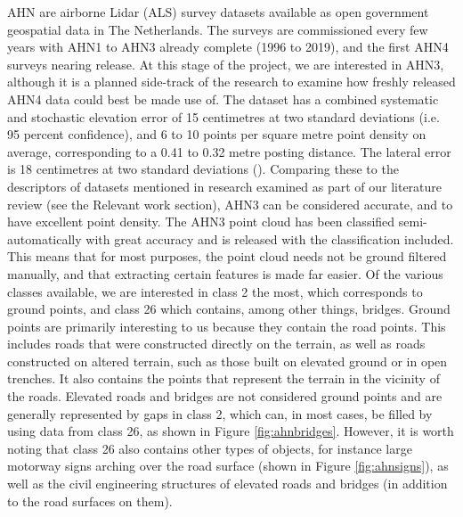 AHN are airborne Lidar (ALS) survey datasets available as open government geospatial data in The Netherlands. The surveys are commissioned every few years with AHN1 to AHN3 already complete (1996 to 2019), and the first AHN4 surveys nearing release. At this stage of the project, we are interested in AHN3, although it is a planned side-track of the research to examine how freshly released AHN4 data could best be made use of. The dataset has a combined systematic and stochastic elevation error of 15 centimetres at two standard deviations (i.e. 95 percent confidence), and 6 to 10 points per square metre point density on average, corresponding to a 0.41 to 0.32 metre posting distance. The lateral error is 18 centimetres at two standard deviations (\cite{ahn_kwaliteit}). Comparing these to the descriptors of datasets mentioned in research examined as part of our literature review (see the Relevant work section), AHN3 can be considered accurate, and to have excellent point density. The AHN3 point cloud has been classified semi-automatically with great accuracy and is released with the classification included. This means that for most purposes, the point cloud needs not be ground filtered manually, and that extracting certain features is made far easier. Of the various classes available, we are interested in class 2 the most, which corresponds to ground points, and class 26 which contains, among other things, bridges. Ground points are primarily interesting to us because they contain the road points. This includes roads that were constructed directly on the terrain, as well as roads constructed on altered terrain, such as those built on elevated ground or in open trenches. It also contains the points that represent the terrain in the vicinity of the roads. Elevated roads and bridges are not considered ground points and are generally represented by gaps in class 2, which can, in most cases, be filled by using data from class 26, as shown in Figure \ref{fig:ahnbridges}. However, it is worth noting that class 26 also contains other types of objects, for instance large motorway signs arching over the road surface (shown in Figure \ref{fig:ahnsigns}), as well as the civil engineering structures of elevated roads and bridges (in addition to the road surfaces on them).
